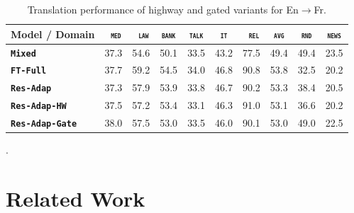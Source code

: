 \documentclass[11pt,a4paper]{article}
\newcommand{\fyFuture}[1]{\done[FY]\Todo[FY:]{\textcolor{red}{#1}}}
\newcommand{\mpDone}[1]{\done[MP]\Todo[MP:]{\textcolor{green}{#1}}}
\newcommand{\domain}[1]{\texttt{\textsc{#1}}}
\newcommand{\system}[1]{\texttt{\textbf{#1}}}
\begin{document}
\begin{table}[htbp]
  \centering
  \begin{tabular}{|p{3cm}|*{7}{r|}|r|r|} \hline
    Model / Domain & \multicolumn{1}{c|}{\domain{ med}} & \multicolumn{1}{c|}{\domain{ law}} & \multicolumn{1}{c|}{\domain{bank}} & \multicolumn{1}{c|}{\domain{talk}} & \multicolumn{1}{c|}{\domain{ it }} & \multicolumn{1}{c|}{\domain{ rel}} & \multicolumn{1}{c||}{\domain{avg}} & \multicolumn{1}{c|}{\domain{rnd}} & \multicolumn{1}{c|}{\domain{news}} \\ \hline %
    \system{Mixed}             & 37.3 & 54.6 & 50.1 & 33.5 & 43.2 & 77.5     &  49.4 & 49.4 & 23.5 \\ %
    \system{FT-Full}             & 37.7 & 59.2 & 54.5 & 34.0 & 46.8 & 90.8   & 53.8 & 32.5 & 20.2  \\ %
    \system{Res-Adap}         & 37.3 & 57.9 & 53.9 & 33.8 & 46.7 & 90.2   & 53.3 & 38.4 & 20.5 \\ %
    \system{Res-Adap-HW}   & 37.5 & 57.2 & 53.4 & 33.1 & 46.3 & 91.0  & 53.1 & 36.6 & 20.2 \\ %
    \system{Res-Adap-Gate}  & 38.0 & 57.5& 53.0 & 33.5 & 46.0 & 90.1  & 53.0 & 49.0 & 22.5 \\ %
    \hline
  \end{tabular}
  \caption{Translation performance of highway and gated variants for En$\rightarrow$Fr.
  }
  \label{tab:performance-random}
\end{table}
\fyFuture{Computation time should also report the time it takes for the complete tuning process, not one iteration which will be more or less the same}.

\section{Related Work \label{sec:related}}
\mpDone{related work}
\end{document}
